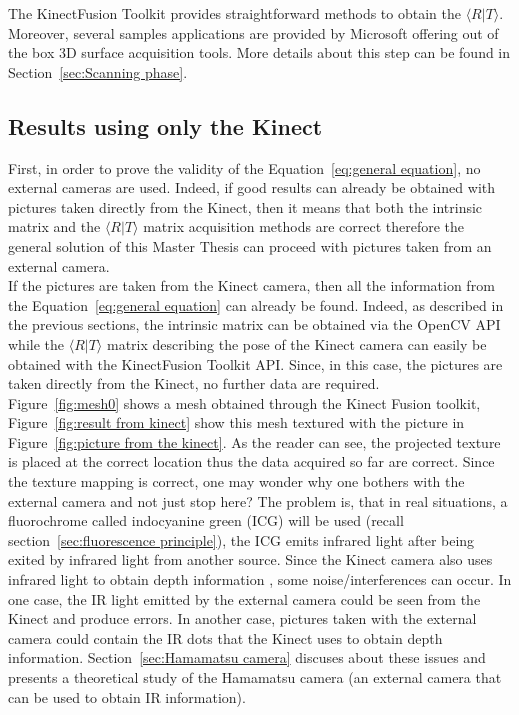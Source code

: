 The KinectFusion Toolkit provides straightforward methods to obtain the $\langle R\vert T\rangle$. Moreover, several samples applications are provided by Microsoft offering out of the box 3D surface acquisition tools. More details about this step can be found in Section~\ref{sec:Scanning phase}.

\subsection{Results using only the Kinect}
\label{sec:Results using only the Kinect}

First, in order to prove the validity of the Equation~\ref{eq:general equation}, no external cameras are used. Indeed, if good results can already be obtained with pictures taken directly from the Kinect, then it means that both the intrinsic matrix and the $\langle R\vert T\rangle$ matrix acquisition methods are correct therefore the general solution of this Master Thesis can proceed with pictures taken from an external camera.\\

If the pictures are taken from the Kinect camera, then all the information from the Equation~\ref{eq:general equation} can already be found. Indeed, as described in the previous sections, the intrinsic matrix can be obtained via the OpenCV API while the $\langle R\vert T\rangle$ matrix describing the pose of the Kinect camera can easily be obtained with the KinectFusion Toolkit API. Since, in this case, the pictures are taken directly from the Kinect, no further data are required. \\

Figure~\ref{fig:mesh0} shows a mesh obtained through the Kinect Fusion toolkit, Figure~\ref{fig:result from kinect} show this mesh textured with the picture in Figure~\ref{fig:picture from the kinect}. As the reader can see, the projected texture is placed at the correct location thus the data acquired so far are correct. Since the texture mapping is correct, one may wonder why one bothers with the external camera and not just stop here? The problem is, that in real situations, a fluorochrome called indocyanine green (ICG) will be used (recall section~\ref{sec:fluorescence principle}), the ICG emits infrared light after being exited by infrared light from another source. Since the Kinect camera also uses infrared light to obtain depth information \cite{freedman_depth_2008}, some noise/interferences can occur. In one case, the IR light emitted by the external camera could be seen from the Kinect and produce errors. In another case, pictures taken with the external camera could contain the IR dots that the Kinect uses to obtain depth information.  Section~\ref{sec:Hamamatsu camera} discuses about these issues and presents a theoretical study of the Hamamatsu camera (an external camera that can be used to obtain IR information). \\

